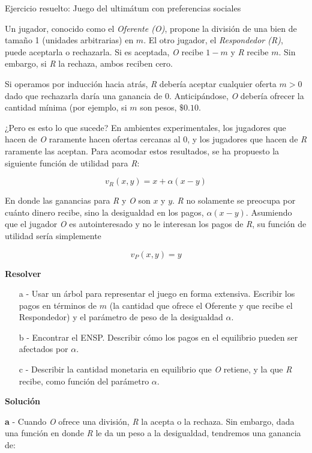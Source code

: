 \documentclass[12pt]{scrartcl}
\begin{document}
\begin{exbox}{Ejercicio resuelto: Juego del ultimátum con preferencias sociales}
	    
	Un jugador, conocido como el \textit{Oferente (O)}, propone la división de una bien de tamaño 1 (unidades arbitrarias) en $m$. El otro jugador, el \textit{Respondedor (R)}, puede aceptarla o rechazarla. Si es aceptada, \textit{O} recibe $1-m$ y \textit{R} recibe $m$. Sin embargo, si \textit{R} la rechaza, ambos reciben cero. 
	    
	Si operamos por inducción hacia atrás, \textit{R} debería aceptar cualquier oferta $m > 0$ dado que rechazarla daría una ganancia de 0. Anticipándose, \textit{O} debería ofrecer la cantidad mínima (por ejemplo, si $m$ son pesos, $\$ 0.10$. 
	    
	¿Pero es esto lo que sucede? En ambientes experimentales, los jugadores que hacen de \textit{O} raramente hacen ofertas cercanas al 0, y los jugadores que hacen de \textit{R} raramente las aceptan. Para acomodar estos resultados, se ha propuesto la siguiente función de utilidad para \textit{R}:
	    
	\[ v_R(x, y) = x + \alpha(x - y)\]
	    
	En donde las ganancias para \textit{R} y \textit{O} son $x$ y $y$. \textit{R} no solamente se preocupa por cuánto dinero recibe, sino la desigualdad en los pagos, $\alpha(x - y)$. Asumiendo que el jugador \textit{O} es autointeresado y no le interesan los pagos de \textit{R}, su función de utilidad sería simplemente
	    
	\[  v_P(x,y) = y \]
	    
	\textbf{Resolver}
	    
	\begin{enumerate}
		\item[a] - Usar un árbol para representar el juego en forma extensiva. Escribir los pagos en términos de $m$ (la cantidad que ofrece el Oferente y que recibe el Respondedor) y el parámetro de peso de la desigualdad $\alpha$.
		\item[b] - Encontrar el ENSP. Describir cómo los pagos en el equilibrio pueden ser afectados por $\alpha$.
		\item[c] - Describir la cantidad monetaria en equilibrio que \textit{O} retiene, y la que \textit{R} recibe, como función del parámetro $\alpha$.
	\end{enumerate}
	
	\textbf{Solución}
	
	\textbf{a} - Cuando \textit{O} ofrece una división, \textit{R} la acepta o la rechaza. Sin embargo, dada una función en donde \textit{R} le da un peso a la desigualdad, tendremos una ganancia de:
	

\end{exbox}
\end{document}
